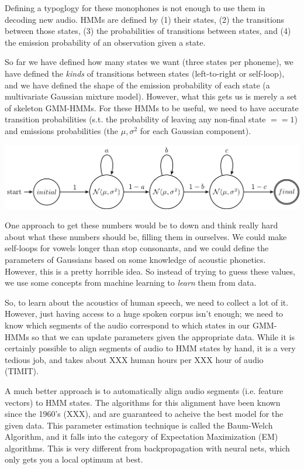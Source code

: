 \documentclass[10pt,a4paper]{article}
\begin{document}
\begin{enumerate}
Defining a typoglogy for these monophones is not enough to use them in decoding new audio. HMMs are defined by (1) their states, (2) the transitions between those states, (3) the probabilities of transitions between states, and (4) the emission probability of an observation given a state.

So far we have defined how many states we want (three states per phoneme), we have defined the \textit{kinds} of transitions between states (left-to-right or self-loop), and we have defined the shape of the emission probability of each state (a multivariate Gaussian mixture model). However, what this gets us is merely a set of skeleton GMM-HMMs. For these HMMs to be useful, we need to have accurate transition probabilities (s.t. the probability of leaving any non-final state $== 1$) and emissions probabilities (the $\mu, \sigma^2$ for each Gaussian component).

\begin{center}
\includegraphics[width=.9\textwidth,keepaspectratio]{figs/skeleton-hmm.png}
\end{center}

One approach to get these numbers would be to down and think really hard about what these numbers should be, filling them in ourselves. We could make self-loops for vowels longer than stop consonants, and we could define the parameters of Gaussians based on some knowledge of acoustic phonetics. However, this is a pretty horrible idea. So instead of trying to guess these values, we use some concepts from machine learning to \textit{learn} them from data.

So, to learn about the acoustics of human speech, we need to collect a lot of it. However, just having access to a huge spoken corpus isn't enough; we need to know which segments of the audio correspond to which states in our GMM-HMMs so that we can update parameters given the appropriate data. While it is certainly possible to align segments of audio to HMM states by hand, it is a very tedious job, and takes about XXX human hours per XXX hour of audio (TIMIT).

A much better approach is to automatically align audio segments (i.e. feature vectors) to HMM states. The algorithms for this alignment have been known since the 1960's (XXX), and are guaranteed to acheive the best model for the given data. This parameter estimation technique is called the Baum-Welch Algorithm, and it falls into the category of Expectation Maximization (EM) algorithms. This is very different from backpropagation with neural nets, which only gets you a local optimum at best.


\end{enumerate}
\end{document}

